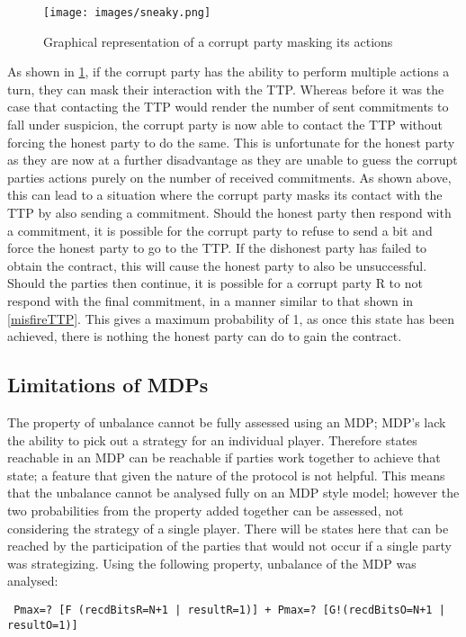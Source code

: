 \documentclass{l4proj}
\begin{document}
\begin{figure}[ht!]
\centering
\texttt{[image: images/sneaky.png]}
\caption{Graphical representation of a corrupt party masking its actions}
\label{sneak}
\end{figure}

As shown in \ref{sneak}, if the corrupt party has the ability to perform multiple actions a turn, they can mask their interaction with the TTP. Whereas before it was the case that contacting the TTP would render the number of sent commitments to fall under suspicion, the corrupt party is now able to contact the TTP without forcing the honest party to do the same. This is unfortunate for the honest party as they are now at a further disadvantage as they are unable to guess the corrupt parties actions purely on the number of received commitments. As shown above, this can lead to a situation where the corrupt party masks its contact with the TTP by also sending a commitment. Should the honest party then respond with a commitment, it is possible for the corrupt party to refuse to send a bit and force the honest party to go to the TTP. If the dishonest party has failed to obtain the contract, this will cause the honest party to also be unsuccessful. Should the parties then continue, it is possible for a corrupt party R to not respond with the final commitment, in a manner similar to that shown in \ref{misfireTTP}. This gives a maximum probability of 1, as once this state has been achieved, there is nothing the honest party can do to gain the contract. 

\subsection{Limitations of MDPs}

The property of unbalance cannot be fully assessed using an MDP; MDP's lack the ability to pick out a strategy for an individual player. Therefore states reachable in an MDP can be reachable if parties work together to achieve that state; a feature that given the nature of the protocol is not helpful. This means that the unbalance cannot be analysed fully on an MDP style model; however the two probabilities from the property added together can be assessed, not considering the strategy of a single player. There will be states here that can be reached by the participation of the parties that would not occur if a single party was strategizing. Using the following property, unbalance of the MDP was analysed:
\begin{lstlisting}
 Pmax=? [F (recdBitsR=N+1 | resultR=1)] + Pmax=? [G!(recdBitsO=N+1 | resultO=1)]
\end{lstlisting}
\end{document}
